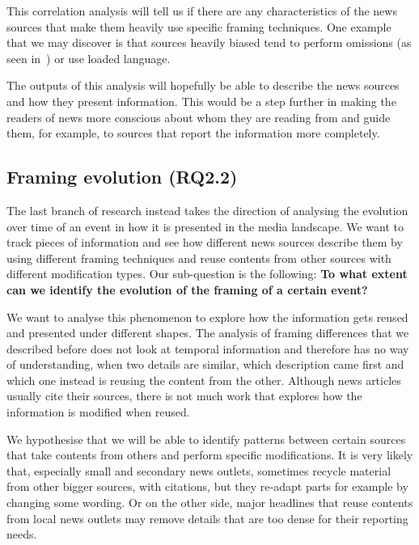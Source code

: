 
This correlation analysis will tell us if there are any characteristics of the news sources that make them heavily use specific framing techniques.
One example that we may discover is that sources heavily biased tend to perform omissions (as seen in~\citet{bountouridis2018explaining}) or use loaded language.


The outputs of this analysis will hopefully be able to describe the news sources and how they present information.
This would be a step further in making the readers of news more conscious about whom they are reading from and guide them, for example, to sources that report the information more completely.


\subsection{Framing evolution (RQ2.2)}
The last branch of research instead takes the direction of analysing the evolution over time of an event in how it is presented in the media landscape.
We want to track pieces of information and see how different news sources describe them by using different framing techniques and reuse contents from other sources with different modification types.
Our sub-question is the following: \textbf{To what extent can we identify the evolution of the framing of a certain event?}

We want to analyse this phenomenon to explore how the information gets reused and presented under different shapes.
The analysis of framing differences that we described before does not look at temporal information and therefore has no way of understanding, when two details are similar, which description came first and which one instead is reusing the content from the other.
Although news articles usually cite their sources, there is not much work that explores how the information is modified when reused.


We hypothesise that we will be able to identify patterns between certain sources that take contents from others and perform specific modifications.
It is very likely that, especially small and secondary news outlets, sometimes recycle material from other bigger sources, with citations, but they re-adapt parts for example by changing some wording.
Or on the other side, major headlines that reuse contents from local news outlets may remove details that are too dense for their reporting needs.

